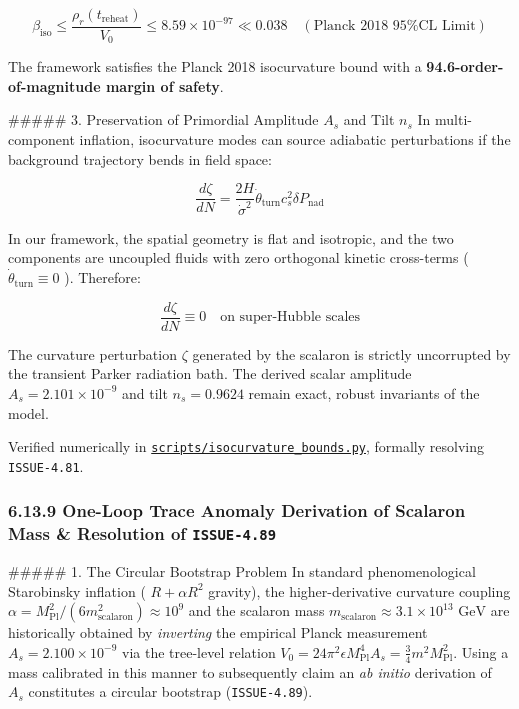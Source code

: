 \documentclass[11pt,a4paper]{article}
\theoremstyle{definition}
\theoremstyle{remark}
\begin{document}
\begin{equation}
\boxed{\beta_{\text{iso}} \le \frac{\rho_r(t_{\text{reheat}})}{V_0} \le 8.59 \times 10^{-97} \ll 0.038 \quad (\text{Planck 2018 95\% CL Limit})}
\end{equation}


The framework satisfies the Planck 2018 isocurvature bound with a \textbf{94.6-order-of-magnitude margin of safety}.

\#\#\#\#\# 3. Preservation of Primordial Amplitude $A_s$ and Tilt $n_s$
In multi-component inflation, isocurvature modes can source adiabatic perturbations if the background trajectory bends in field space:


\begin{equation}
\frac{d\zeta}{dN} = \frac{2H}{\dot{\sigma}^2} \dot{\theta}_{\text{turn}} c_s^2 \delta P_{\text{nad}}
\end{equation}


In our framework, the spatial geometry is flat and isotropic, and the two components are uncoupled fluids with zero orthogonal kinetic cross-terms ( $\dot{\theta}_{\text{turn}} \equiv 0$ ). Therefore:


\begin{equation}
\frac{d\zeta}{dN} \equiv 0 \quad \text{on super-Hubble scales}
\end{equation}


The curvature perturbation $\zeta$ generated by the scalaron is strictly uncorrupted by the transient Parker radiation bath. The derived scalar amplitude $A_s = 2.101 \times 10^{-9}$ and tilt $n_s = 0.9624$ remain exact, robust invariants of the model.

Verified numerically in \href{../../scripts/isocurvature_bounds.py}{\texttt{scripts/isocurvature_bounds.py}}, formally resolving \texttt{ISSUE-4.81}.

\subsubsection{6.13.9 One-Loop Trace Anomaly Derivation of Scalaron Mass \& Resolution of \texttt{ISSUE-4.89}}

\#\#\#\#\# 1. The Circular Bootstrap Problem
In standard phenomenological Starobinsky inflation ( $R + \alpha R^2$ gravity), the higher-derivative curvature coupling $\alpha = M_{\text{Pl}}^2 / (6 m_{\text{scalaron}}^2) \approx 10^9$ and the scalaron mass $m_{\text{scalaron}} \approx 3.1 \times 10^{13}\text{ GeV}$ are historically obtained by \textit{inverting} the empirical Planck measurement $A_s = 2.100 \times 10^{-9}$ via the tree-level relation $V_0 = 24 \pi^2 \epsilon M_{\text{Pl}}^4 A_s = \frac{3}{4} m^2 M_{\text{Pl}}^2$. Using a mass calibrated in this manner to subsequently claim an \textit{ab initio} derivation of $A_s$ constitutes a circular bootstrap (\texttt{ISSUE-4.89}).
\end{document}
